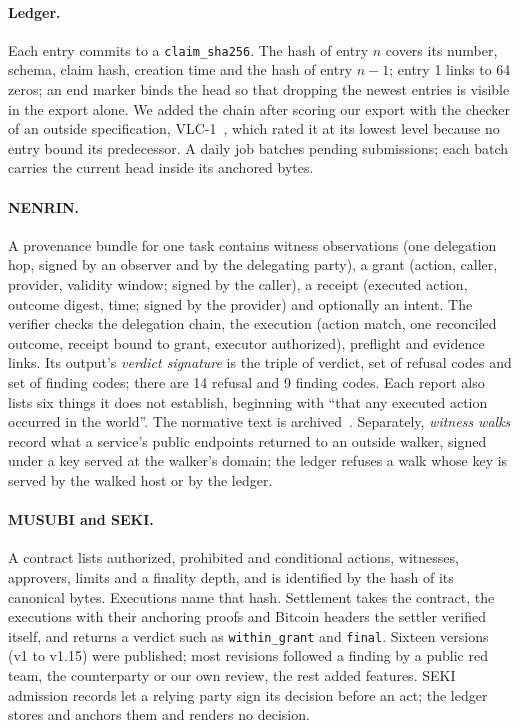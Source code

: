 \documentclass[11pt,a4paper]{article}
\newcommand{\code}[1]{\texttt{#1}}
\begin{document}
\paragraph{Ledger.} Each entry commits to a \code{claim\_sha256}. The hash of entry $n$ covers its number, schema, claim hash, creation time and the hash of entry $n-1$; entry 1 links to 64 zeros; an end marker binds the head so that dropping the newest entries is visible in the export alone. We added the chain after scoring our export with the checker of an outside specification, VLC-1~\citep{vlc1}, which rated it at its lowest level because no entry bound its predecessor. A daily job batches pending submissions; each batch carries the current head inside its anchored bytes.

\paragraph{NENRIN.} A provenance bundle for one task contains witness observations (one delegation hop, signed by an observer and by the delegating party), a grant (action, caller, provider, validity window; signed by the caller), a receipt (executed action, outcome digest, time; signed by the provider) and optionally an intent. The verifier checks the delegation chain, the execution (action match, one reconciled outcome, receipt bound to grant, executor authorized), preflight and evidence links. Its output's \emph{verdict signature} is the triple of verdict, set of refusal codes and set of finding codes; there are 14 refusal and 9 finding codes. Each report also lists six things it does not establish, beginning with ``that any executed action occurred in the world''. The normative text is archived~\citep{zenodoverifier}. Separately, \emph{witness walks} record what a service's public endpoints returned to an outside walker, signed under a key served at the walker's domain; the ledger refuses a walk whose key is served by the walked host or by the ledger.

\paragraph{MUSUBI and SEKI.} A contract lists authorized, prohibited and conditional actions, witnesses, approvers, limits and a finality depth, and is identified by the hash of its canonical bytes. Executions name that hash. Settlement takes the contract, the executions with their anchoring proofs and Bitcoin headers the settler verified itself, and returns a verdict such as \code{within\_grant} and \code{final}. Sixteen versions (v1 to v1.15) were published; most revisions followed a finding by a public red team, the counterparty or our own review, the rest added features. SEKI admission records let a relying party sign its decision before an act; the ledger stores and anchors them and renders no decision.
\end{document}
